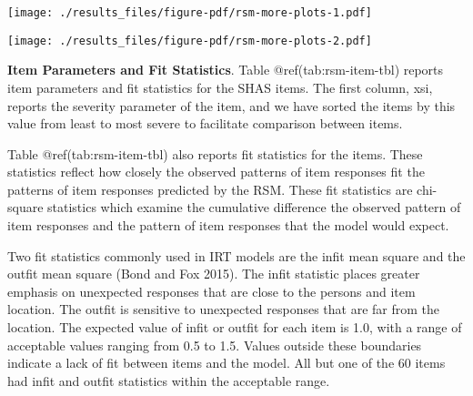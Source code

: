 \documentclass[
  letterpaper,
  DIV=11,
  numbers=noendperiod]{scrreport}
\begin{document}
\texttt{[image: ./results\_files/figure-pdf/rsm-more-plots-1.pdf]}

\texttt{[image: ./results\_files/figure-pdf/rsm-more-plots-2.pdf]}

\textbf{Item Parameters and Fit Statistics}. Table
@ref(tab:rsm-item-tbl) reports item parameters and fit statistics for
the SHAS items. The first column, xsi, reports the severity parameter of
the item, and we have sorted the items by this value from least to most
severe to facilitate comparison between items.

Table @ref(tab:rsm-item-tbl) also reports fit statistics for the items.
These statistics reflect how closely the observed patterns of item
responses fit the patterns of item responses predicted by the RSM. These
fit statistics are chi-square statistics which examine the cumulative
difference the observed pattern of item responses and the pattern of
item responses that the model would expect.

Two fit statistics commonly used in IRT models are the infit mean square
and the outfit mean square (Bond and Fox 2015). The infit statistic
places greater emphasis on unexpected responses that are close to the
persons and item location. The outfit is sensitive to unexpected
responses that are far from the location. The expected value of infit or
outfit for each item is 1.0, with a range of acceptable values ranging
from 0.5 to 1.5. Values outside these boundaries indicate a lack of fit
between items and the model. All but one of the 60 items had infit and
outfit statistics within the acceptable range.
\end{document}
